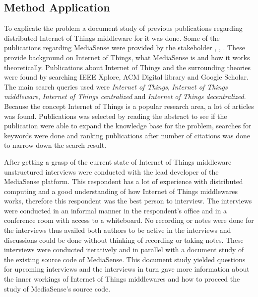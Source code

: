 %

\subsection{Method Application}
To explicate the problem a document study of previous publications regarding distributed Internet of Things middleware for it was done. Some of the publications regarding MediaSense were provided by the stakeholder \cite{TheMediaSenseFramework}, \cite{Kanter539187}, \cite{Walters413794}. These provide background on Internet of Things, what MediaSense is and how it works theoretically. Publications about Internet of Things and the surrounding theories were found by searching IEEE Xplore, ACM Digital library and Google Scholar. The main search queries used were \emph{Internet of Things}, \emph{Internet of Things middleware}, \emph{Internet of Things centralized} and \emph{Internet of Things decentralized}. Because the concept Internet of Things is a popular research area, a lot of articles was found. Publications was selected by reading the abstract to see if the publication were able to expand the knowledge base for the problem, searches for keywords were done and ranking publications after number of citations was done to narrow down the search result. 

After getting a grasp of the current state of Internet of Things middleware unstructured interviews were conducted with the lead developer of the MediaSense platform. This respondent has a lot of experience with distributed computing and a good understanding of how Internet of Things middlewares works, therefore this respondent was the best person to interview. The interviews were conducted in an informal manner in the respondent's office and in a conference room with access to a whiteboard. No recording or notes were done for the interviews thus availed both authors to be active in the interviews and discussions could be done without thinking of recording or taking notes. These interviews were conducted iteratively and in parallel with a document study of the existing source code of MediaSense. This document study yielded questions for upcoming interviews and the interviews in turn gave more information about the inner workings of Internet of Things middlewares and how to proceed the study of MediaSense's source code.

